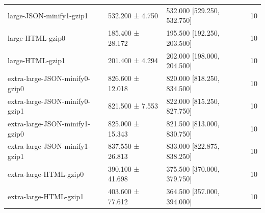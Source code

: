 \begin{tabular}{lllr}
large-JSON-minify1-gzip1 & 532.200 ± 4.750 & 532.000 [529.250, 532.750] & 10 \\
large-HTML-gzip0 & 185.400 ± 28.172 & 195.500 [192.250, 203.500] & 10 \\
large-HTML-gzip1 & 201.400 ± 4.294 & 202.000 [198.000, 204.500] & 10 \\
extra-large-JSON-minify0-gzip0 & 826.600 ± 12.018 & 820.000 [818.250, 834.500] & 10 \\
extra-large-JSON-minify0-gzip1 & 821.500 ± 7.553 & 822.000 [815.250, 827.750] & 10 \\
extra-large-JSON-minify1-gzip0 & 825.000 ± 15.343 & 821.500 [813.000, 830.750] & 10 \\
extra-large-JSON-minify1-gzip1 & 837.550 ± 26.813 & 833.000 [822.875, 838.250] & 10 \\
extra-large-HTML-gzip0 & 390.100 ± 41.698 & 375.500 [370.000, 379.750] & 10 \\
extra-large-HTML-gzip1 & 403.600 ± 77.612 & 364.500 [357.000, 394.000] & 10 \\
\bottomrule
\end{tabular}
